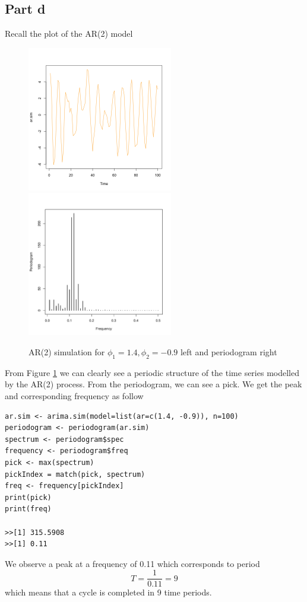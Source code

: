 \documentclass[11pt, oneside]{article}   	%
\begin{document}
\subsection{Part d}
Recall the plot of the AR(2) model
\begin{figure}[H] %
   \centering
   \includegraphics[width=2.5in]{../code/armaSimulation1.png} 
   \includegraphics[width=2.5in]{../code/periodogram1} 
   \caption{AR(2) simulation for $\phi_{1} = 1.4, \phi_{2}= -0.9$ left and periodogram right}
   \label{fig:ar2}
\end{figure}
\justify
From Figure \ref{fig:ar2} we can clearly see a periodic structure of the time series modelled by the AR(2) process. From the periodogram, we can see a pick. We get the peak and corresponding frequency as follow
\begin{lstlisting}
ar.sim <- arima.sim(model=list(ar=c(1.4, -0.9)), n=100)
periodogram <- periodogram(ar.sim)
spectrum <- periodogram$spec
frequency <- periodogram$freq
pick <- max(spectrum)
pickIndex = match(pick, spectrum)
freq <- frequency[pickIndex]
print(pick)
print(freq)

>>[1] 315.5908
>>[1] 0.11
\end{lstlisting}
\justify
We observe a peak at a frequency of 0.11 which corresponds to period 
\begin{equation}
T = \frac{1}{0.11} = 9
\end{equation} 
which means that a cycle is completed in 9 time periods.
\end{document}
